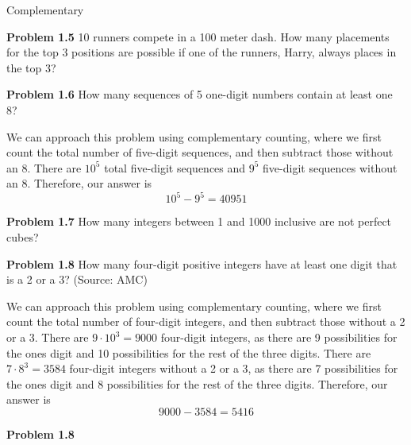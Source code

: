 \documentclass[11pt]{scrartcl}
\begin{document}
Complementary 
\begin{tcolorbox}
\textbf{Problem 1.5} 10 runners compete in a 100 meter dash. How many placements for the top 3 positions are possible if one of the runners, Harry, always places in the top 3?
\end{tcolorbox}
\begin{tcolorbox}
\textbf{Problem 1.6} How many sequences of 5 one-digit numbers contain at least one 8?
\end{tcolorbox}
\noindent 
We can approach this problem using complementary counting, where we first count the total number of five-digit sequences, and then subtract those without an 8. There are $10^5$ total five-digit sequences and $9^5$ five-digit sequences without an 8. Therefore, our answer is 
$$10^5-9^5=40951$$
\begin{tcolorbox}
\textbf{Problem 1.7} How many integers between 1 and 1000 inclusive are not perfect cubes? 
\end{tcolorbox}
\begin{tcolorbox}
\textbf{Problem 1.8} How many four-digit positive integers have at least one digit that is a 2 or a 3? (Source: AMC) 
\end{tcolorbox}
\noindent 
We can approach this problem using complementary counting, where we first count the total number of four-digit integers, and then subtract those without a 2 or a 3. There are $9 \cdot 10^3=9000$ four-digit integers, as there are 9 possibilities for the ones digit and 10 possibilities for the rest of the three digits. There are $7 \cdot 8^3=3584$ four-digit integers without a 2 or a 3, as there are 7 possibilities for the ones digit and 8 possibilities for the rest of the three digits. Therefore, our answer is 
$$9000-3584=5416$$
\begin{tcolorbox}
\textbf{Problem 1.8} 
\end{tcolorbox}
\end{document}

